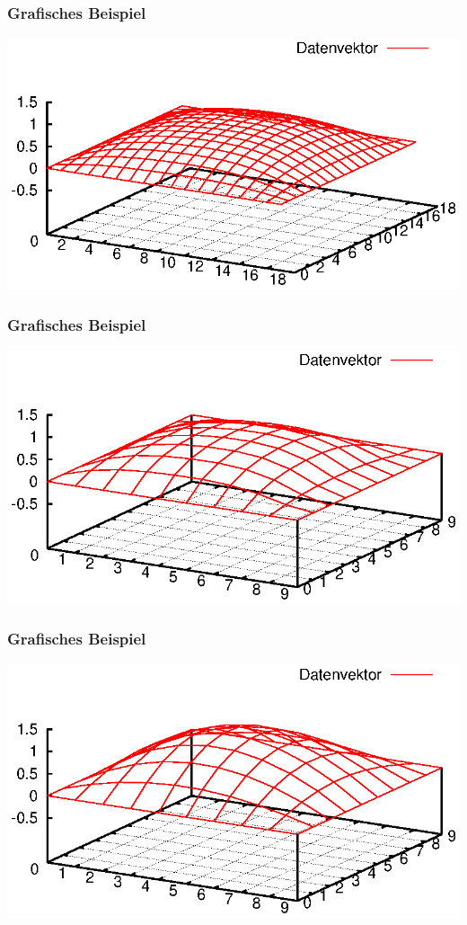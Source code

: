 \documentclass{beamer}
\begin{document}
\begin{frame}\frametitle{Grafisches Beispiel}\includegraphics[trim=25 0 25 0, clip, width=\textwidth]{plots/003}\end{frame}
\begin{frame}\frametitle{Grafisches Beispiel}\includegraphics[trim=25 0 25 0, clip, width=\textwidth]{plots/004}\end{frame}
\begin{frame}\frametitle{Grafisches Beispiel}\includegraphics[trim=25 0 25 0, clip, width=\textwidth]{plots/005}\end{frame}
\end{document}
